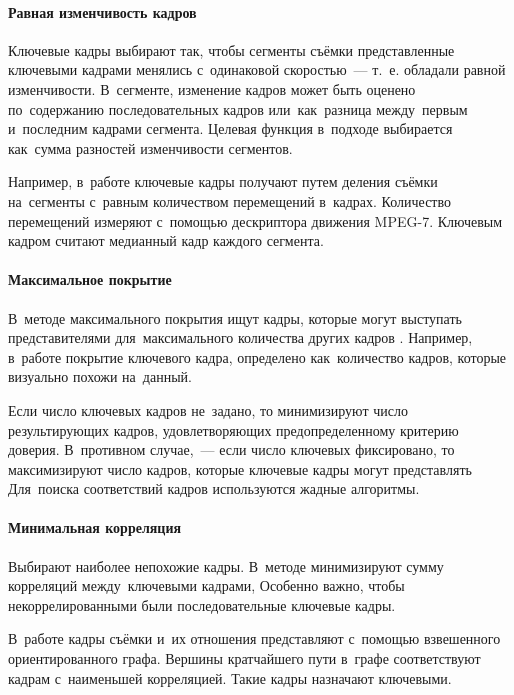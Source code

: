 \paragraph{Равная изменчивость кадров}

Ключевые кадры выбирают так,
чтобы сегменты съёмки представленные ключевыми кадрами
менялись с~одинаковой скоростью~— т.~е. обладали равной изменчивости.
В~сегменте, изменение кадров может быть оценено
по~содержанию последовательных кадров \cite{Zhang:2003}
или~как~разница между~первым и~последним кадрами сегмента.
Целевая функция в~подходе выбирается как~сумма
разностей изменчивости сегментов.

Например, в~работе \cite{Divakaran:2002} ключевые кадры получают путем
деления съёмки на~сегменты с~равным количеством перемещений в~кадрах.
Количество перемещений измеряют с~помощью дескриптора движения
MPEG-7. Ключевым кадром считают медианный кадр каждого сегмента.

\paragraph{Максимальное покрытие}

В~методе максимального покрытия ищут кадры, которые могут
выступать представителями для~максимального количества других
кадров \cite{Truong:2007}.
Например, в~работе \cite{Chang:1999} покрытие ключевого кадра, определено
как~количество кадров, которые визуально похожи на~данный.

Если число ключевых кадров не~задано,
то минимизируют число результирующих кадров,
удовлетворяющих предопределенному критерию доверия.
В~противном случае,~— если число ключевых фиксировано, то
максимизируют число кадров, которые ключевые кадры
могут представлять \cite{Rong:2004} \cite{Cooper:2005}
Для~поиска соответствий кадров используются жадные алгоритмы.


\paragraph{Минимальная корреляция}

Выбирают наиболее непохожие кадры.
В~методе минимизируют сумму корреляций между~ключевыми кадрами,
Особенно важно, чтобы  некоррелированными были последовательные ключевые кадры.

В~работе \cite{Porter:2003} кадры съёмки и~их отношения представляют
с~помощью взвешенного ориентированного графа.
Вершины кратчайшего пути в~графе соответствуют кадрам
с~наименьшей корреляцией. Такие кадры назначают ключевыми.


